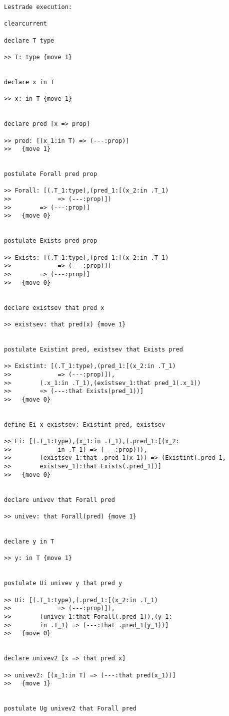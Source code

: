 \documentclass[12pt]{article}
\begin{document}
\begin{verbatim}Lestrade execution:

clearcurrent

declare T type

>> T: type {move 1}


declare x in T

>> x: in T {move 1}


declare pred [x => prop]

>> pred: [(x_1:in T) => (---:prop)]
>>   {move 1}


postulate Forall pred prop

>> Forall: [(.T_1:type),(pred_1:[(x_2:in .T_1) 
>>             => (---:prop)])
>>        => (---:prop)]
>>   {move 0}


postulate Exists pred prop

>> Exists: [(.T_1:type),(pred_1:[(x_2:in .T_1) 
>>             => (---:prop)])
>>        => (---:prop)]
>>   {move 0}


declare existsev that pred x

>> existsev: that pred(x) {move 1}


postulate Existint pred, existsev that Exists pred

>> Existint: [(.T_1:type),(pred_1:[(x_2:in .T_1) 
>>             => (---:prop)]),
>>        (.x_1:in .T_1),(existsev_1:that pred_1(.x_1)) 
>>        => (---:that Exists(pred_1))]
>>   {move 0}


define Ei x existsev: Existint pred, existsev

>> Ei: [(.T_1:type),(x_1:in .T_1),(.pred_1:[(x_2:
>>             in .T_1) => (---:prop)]),
>>        (existsev_1:that .pred_1(x_1)) => (Existint(.pred_1,
>>        existsev_1):that Exists(.pred_1))]
>>   {move 0}


declare univev that Forall pred

>> univev: that Forall(pred) {move 1}


declare y in T

>> y: in T {move 1}


postulate Ui univev y that pred y

>> Ui: [(.T_1:type),(.pred_1:[(x_2:in .T_1) 
>>             => (---:prop)]),
>>        (univev_1:that Forall(.pred_1)),(y_1:
>>        in .T_1) => (---:that .pred_1(y_1))]
>>   {move 0}


declare univev2 [x => that pred x]

>> univev2: [(x_1:in T) => (---:that pred(x_1))]
>>   {move 1}


postulate Ug univev2 that Forall pred


\end{verbatim}
\end{document}
